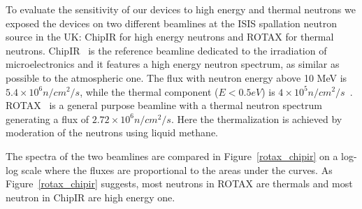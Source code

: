 To evaluate the sensitivity of our devices to high energy and thermal neutrons we exposed the devices on two different beamlines at the ISIS spallation neutron source in the UK: ChipIR for high energy neutrons and ROTAX for thermal neutrons.
ChipIR~\cite{cazzaniga2018progress} is the reference beamline dedicated to the irradiation of microelectronics and it features a high energy neutron spectrum, as similar as possible to the atmospheric one. The flux with neutron energy above 10 MeV is $5.4 \times {10}^6 n/{cm}^2/s$, while the thermal component ($E < 0.5 eV$) is $4 \times {10}^5 n/{cm}^2/s$~\cite{chiesa2018measurement}.
ROTAX~\cite{tietze1989rotax} is a general purpose beamline with a thermal neutron spectrum generating a flux of $2.72\times{10}^6 n/{cm}^2/s$. Here the thermalization is achieved by moderation of the neutrons using liquid methane. 

The spectra of the two beamlines are compared in Figure~\ref{rotax_chipir} on a log-log scale where the fluxes are proportional to the areas under the curves. As Figure~\ref{rotax_chipir} suggests, most neutrons in ROTAX are thermals and most neutron in ChipIR are high energy one.

%

